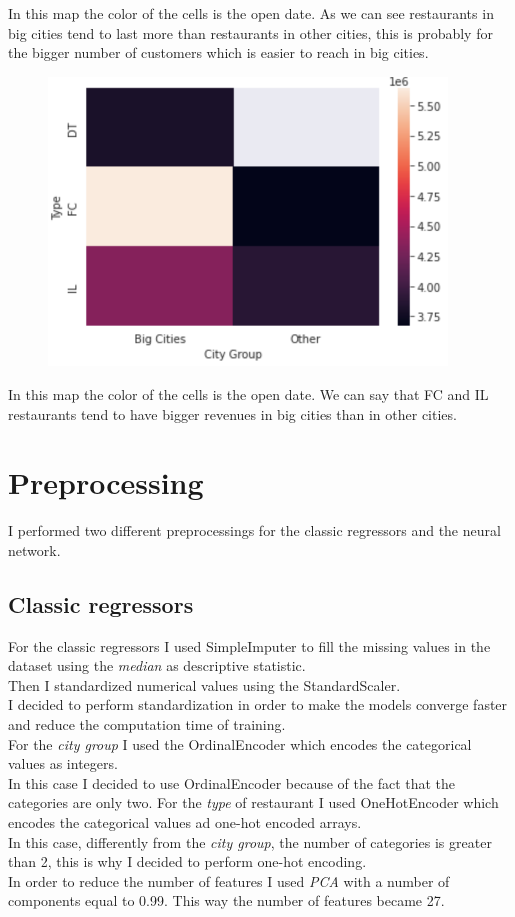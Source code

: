\documentclass[a4paper,10pt]{report}
\begin{document}
In this map the color of the cells is the open date. As we can see restaurants in big cities tend to last more than restaurants in other cities, this is probably for the bigger number of customers which is easier to reach in big cities.
\begin{figure}[H]
    \centering
    \includegraphics[width = 300pt]{img/revenuecitygrouppivot.png}
  \end{figure}
  In this map the color of the cells is the open date. We can say that FC and IL restaurants tend to have bigger revenues in big cities than in other cities.
\section{Preprocessing}
I performed two different preprocessings for the classic regressors and the neural network.\\
\subsection{Classic regressors}
For the classic regressors I used {\selectfont
SimpleImputer} to fill the missing values in the dataset using the \emph{median} as descriptive statistic.\\
Then I standardized numerical values using the {\selectfont StandardScaler}.\\
I decided to perform standardization in order to make the models converge faster and reduce the computation time of training.\\
For the \emph{city group} I used the {\selectfont OrdinalEncoder} which encodes the categorical values as integers.\\
In this case I decided to use {\selectfont OrdinalEncoder} because of the fact that the categories are only two.
For the \emph{type} of restaurant I used {\selectfont OneHotEncoder} which encodes the categorical values ad one-hot encoded arrays.\\
In this case, differently from the \emph{city group}, the number of categories is greater than 2, this is why I decided to perform one-hot encoding.\\
In order to reduce the number of features I used \emph{PCA} with a number of components equal to 0.99.
This way the number of features became 27.
\end{document}
